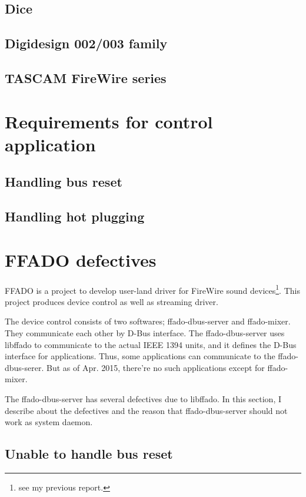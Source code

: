 \documentclass[onecolumn]{article}
\begin{document}
\subsection{Dice}

\subsection{Digidesign 002/003 family}

\subsection{TASCAM FireWire series}

\section{Requirements for control application}

\subsection{Handling bus reset}

\subsection{Handling hot plugging}

\section{FFADO defectives}

FFADO is a project to develop user-land driver for FireWire sound devices\footnote{see my previous report.}. This project produces device control as well as streaming driver.

The device control consists of two softwares; ffado-dbus-server and ffado-mixer. They communicate each other by D-Bus interface. The ffado-dbus-server uses libffado to communicate to the actual IEEE 1394 units, and it defines the D-Bus interface for applications. Thus, some applications can communicate to the ffado-dbus-serer. But as of Apr. 2015, there're no such applications except for ffado-mixer.

The ffado-dbus-server has several defectives due to libffado. In this section, I describe about the defectives and the reason that ffado-dbus-server should not work as system daemon.

\subsection{Unable to handle bus reset}
\end{document}
